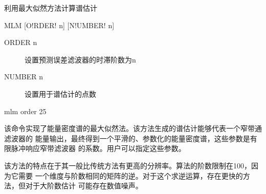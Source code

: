 \label{spe:mlm}

利用最大似然方法计算谱估计

\begin{SACSTX}
MLM [O!RDER! n] [N!UMBER! n]
\end{SACSTX}

\begin{description}
\item [ORDER n] 设置预测误差滤波器的时滞阶数为n
\item [NUMBER n] 设置用于谱估计的点数
\end{description}

\begin{SACDFT}
mlm order 25
\end{SACDFT}

该命令实现了能量密度谱的最大似然法。该方法生成的谱估计能够代表一个窄带通滤波器的
能量输出，最终得到一个平滑的、参数化的能量密度谱，这些参数是有限脉冲响应窄带滤波器
的系数。用户可以指定这些参数。

该方法的特点在于其一般比传统方法有更高的分辨率。算法的阶数限制在100，因为它需要
一个维度与阶数相同的矩阵的逆。对于这个求逆运算，存在更快的方法，但对于大阶数估计
可能存在数值噪声。
